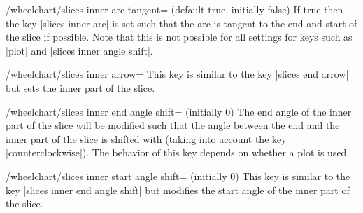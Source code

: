\documentclass[a4paper,english,dvipsnames]{ltxdoc}
\begin{document}
\begin{key}{/wheelchart/slices inner arc tangent= (default true, initially false)}
If true then the key |slices inner arc| is set such that the arc is tangent to the end and start of the slice if possible. Note that this is not possible for all settings for keys such as |plot| and |slices inner angle shift|.
\begin{codeexample}[width=10cm]
\begin{tikzpicture}
\wheelchart[
    counterclockwise,
    data=,
    gap=0.1,
    middle=slices inner\\arc tangent,
    middle style={font=\ttfamily},
    slices inner arc tangent,
    slices style={
        draw=\WCvarB,
        fill=\WCvarB!50,
        ultra thick
    },
    value=1
]{\exampleforthismanual}
\end{tikzpicture}
\end{codeexample}
\end{key}
\begin{key}{/wheelchart/slices inner arrow=}
This key is similar to the key |slices end arrow| but sets the inner part of the slice.
\begin{codeexample}[width=10cm]
\end{codeexample}
\end{key}
\begin{key}{/wheelchart/slices inner end angle shift= (initially 0)}
The end angle of the inner part of the slice will be modified such that the angle between the end and the inner part of the slice is shifted with  (taking into account the key |counterclockwise|). The behavior of this key depends on whether a plot is used.
\end{key}
\begin{key}{/wheelchart/slices inner start angle shift= (initially 0)}
This key is similar to the key |slices inner end angle shift| but modifies the start angle of the inner part of the slice.
\end{key}
\end{document}
